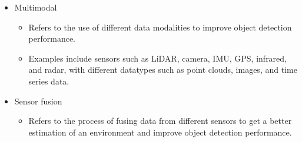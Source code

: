 \documentclass[rnd]{mas_proposal}
\begin{document}
\begin{itemize}
\begin{itemize}
\begin{itemize}
                    \end{itemize}
              \item Multimodal
                    \begin{itemize}
                        \item Refers to the use of different data modalities to improve object detection performance.
                        \item Examples include sensors such as LiDAR, camera, IMU, GPS, infrared, and radar, with different datatypes such as point clouds, images, and time series data.
                    \end{itemize}
              \item Sensor fusion
                    \begin{itemize}
                        \item Refers to the process of fusing data from different sensors to get a better estimation of an environment and improve object detection performance.
                    \end{itemize}
          \end{itemize}





\end{itemize}
\end{document}
